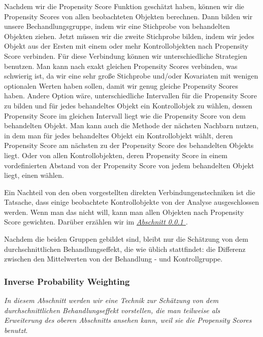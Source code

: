 \documentclass[12pt,a4paper,twoside]{scrartcl}
\numberwithin{equation}{section}
\newcommand{\refsec}[1]{\emph{\hyperref[#1]{Abschnitt \ref*{#1} }}}
\begin{document}
\noindent
Nachdem wir die Propensity Score Funktion geschätzt haben, können wir die Propensity Scores von allen beobachteten Objekten berechnen. Dann bilden wir unsere Bechandlungsgruppe, indem wir eine Stichprobe von behandelten Objekten ziehen. Jetzt müssen wir die zweite Stichprobe bilden, indem wir jedes Objekt aus der Ersten mit einem oder mehr Kontrollobjekten nach Propensity Score verbinden. Für diese Verbindung können wir unterschiedliche Strategien benutzen. Man kann nach exakt gleichen Propensity Scores verbinden, was schwierig ist, da wir eine sehr große Stichprobe und/oder Kovariaten mit wenigen optionalen Werten haben sollen, damit wir genug gleiche Propensity Scores haben. Andere Option wäre, unterschiedliche Intervallen für die Propensity Score zu bilden und für jedes behandeltes Objekt ein  Kontrollobjek zu wählen, dessen Propensity Score im gleichen Intervall liegt wie die Propensity Score von dem behandelten Objekt. Man kann auch die Methode der nächsten Nachbarn nutzen, in dem man für jedes behandeltes Objekt ein Kontrollobjekt wählt, deren Propensity Score am nächsten zu der Propensity Score des behandelten Objekts liegt. Oder von allen Kontrollobjekten, deren Propensity Score in einem vordefinierten Abstand von der Propensity Score von jedem behandelten Objekt liegt, einen wählen\cite{stuart2010matching}.\par 

\noindent
Ein Nachteil von den oben vorgestellten direkten Verbindungenstechniken ist die Tatsache, dass einige beobachtete Kontrollobjekte von der Analyse ausgeschlossen werden. Wenn man das nicht will, kann man allen Objekten nach Propensity Score gewichten. Darüber erzählen wir im \refsec{subsubsec:inverseProbabilityWeighting}. \par

\noindent
Nachdem die beiden Gruppen gebildet sind, bleibt nur die Schätzung von dem durchschnittlichen Behandlungseffekt, die wie üblich stattfindet: die Differenz zwischen den Mittelwerten von der Behandlung - und Kontrollgruppe.
\par 
\subsubsection{Inverse Probability Weighting}\label{subsubsec:inverseProbabilityWeighting}

\noindent
\emph{In diesem Abschnitt werden wir eine Technik zur Schätzung von dem durchschnittlichen Behandlungseffekt vorstellen, die man teilweise als Erweiterung des oberen Abschnitts ansehen kann, weil sie die Propensity Scores benutzt}.
\par
\end{document}
